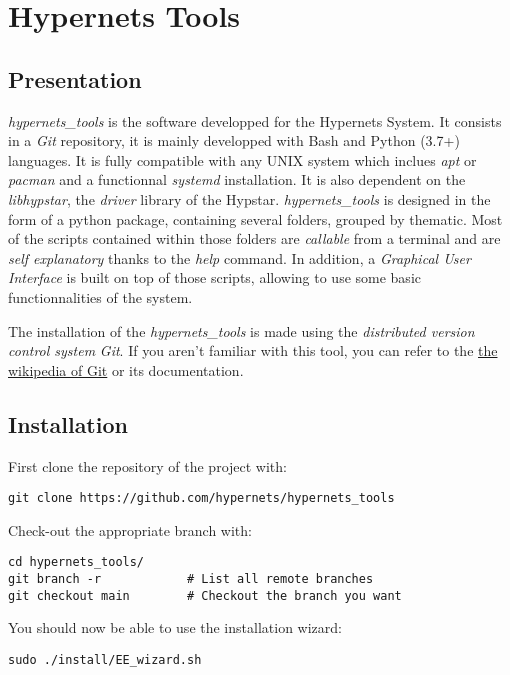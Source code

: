 \section{Hypernets Tools}

\subsection{Presentation}
\par \textit{hypernets\_tools} is the software developped for the Hypernets System.
It consists in a \textit{Git} repository, it is mainly developped with Bash and
Python (3.7+) languages. It is fully compatible with any UNIX system which
inclues \textit{apt} or \textit{pacman} and a functionnal \textit{systemd}
installation. It is also dependent on the \textit{libhypstar}, the \textit{driver} 
library of the Hypstar.
\textit{hypernets\_tools} is designed in the form of a python package,
containing several folders, grouped by thematic.
Most of the scripts contained within those folders are \textit{callable} 
from a terminal and are \textit{self explanatory} thanks to the \textit{help} 
command. In addition, a \textit{Graphical User Interface} is built on top of those 
scripts, allowing to use some basic functionnalities of the system.
\par The installation of the \textit{hypernets\_tools} is made using the 
\textit{distributed version control system} \textit{Git}. 
If you aren't familiar with this tool, you can refer to the 
\href{https://en.wikipedia.org/wiki/Git}{the wikipedia of Git} or 
its documentation. 

\subsection{Installation}
First clone the repository of the project with:
\vspace{-10pt}
\begin{lstlisting}
git clone https://github.com/hypernets/hypernets_tools
\end{lstlisting}
Check-out the appropriate branch with:
\vspace{-10pt}
\begin{lstlisting}
cd hypernets_tools/
git branch -r            # List all remote branches
git checkout main        # Checkout the branch you want
\end{lstlisting}
You should now be able to use the installation wizard:
\vspace{-10pt}
\begin{lstlisting}
sudo ./install/EE_wizard.sh    
\end{lstlisting}

